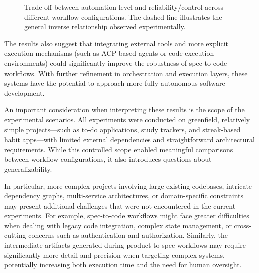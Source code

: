\documentclass[a4paper,12pt]{report}
\begin{document}
\begin{figure}[h!]
\centering
{}
\caption{Trade-off between automation level and reliability/control across different workflow configurations. The dashed line illustrates the general inverse relationship observed experimentally.}
\label{fig:tradeoff}
\end{figure}

The results also suggest that integrating external tools and more explicit execution mechanisms (such as ACP-based agents or code execution environments) could significantly improve the robustness of spec-to-code workflows. With further refinement in orchestration and execution layers, these systems have the potential to approach more fully autonomous software development.

An important consideration when interpreting these results is the scope of the experimental scenarios. All experiments were conducted on greenfield, relatively simple projects---such as to-do applications, study trackers, and streak-based habit apps---with limited external dependencies and straightforward architectural requirements. While this controlled scope enabled meaningful comparisons between workflow configurations, it also introduces questions about generalizability.

In particular, more complex projects involving large existing codebases, intricate dependency graphs, multi-service architectures, or domain-specific constraints may present additional challenges that were not encountered in the current experiments. For example, spec-to-code workflows might face greater difficulties when dealing with legacy code integration, complex state management, or cross-cutting concerns such as authentication and authorization. Similarly, the intermediate artifacts generated during product-to-spec workflows may require significantly more detail and precision when targeting complex systems, potentially increasing both execution time and the need for human oversight.
\end{document}
